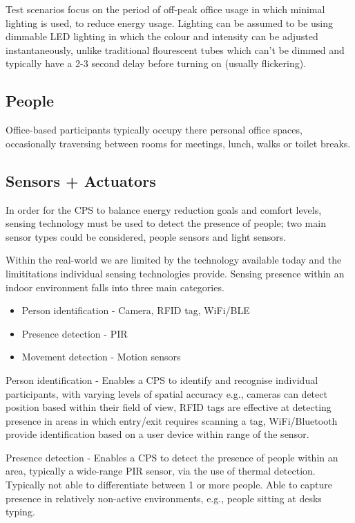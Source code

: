 Test scenarios focus on the period of off-peak office usage in which minimal lighting is used, to reduce energy usage. Lighting can be assumed to be using dimmable LED lighting in which the colour and intensity can be adjusted instantaneously, unlike traditional flourescent tubes which can't be dimmed and typically have a 2-3 second delay before turning on (usually flickering). 

\subsection{People}
\label{subsec:People}
Office-based participants typically occupy there personal office spaces, occasionally traversing between rooms for meetings, lunch, walks or toilet breaks.

\subsection{Sensors + Actuators}
\label{subsec:Sensors + Actuators}

In order for the CPS to balance energy reduction goals and comfort levels, sensing technology must be used to detect the presence of people; two main sensor types could be considered, people sensors and light sensors.

Within the real-world we are limited by the technology available today and the limititations individual sensing technologies provide. Sensing presence within an indoor environment falls into three main categories.

\begin{itemize}
  \item Person identification - Camera, RFID tag, WiFi/BLE
  \item Presence detection - PIR
  \item Movement detection - Motion sensors
\end{itemize}

Person identification - Enables a CPS to identify and recognise individual participants, with varying levels of spatial accuracy e.g., cameras can detect position based within their field of view, RFID tags are effective at detecting presence in areas in which entry/exit requires scanning a tag, WiFi/Bluetooth provide identification based on a user device within range of the sensor.

Presence detection - Enables a CPS to detect the presence of people within an area, typically a wide-range PIR sensor, via the use of thermal detection. Typically not able to differentiate between 1 or more people. Able to capture presence in relatively non-active environments, e.g., people sitting at desks typing.

